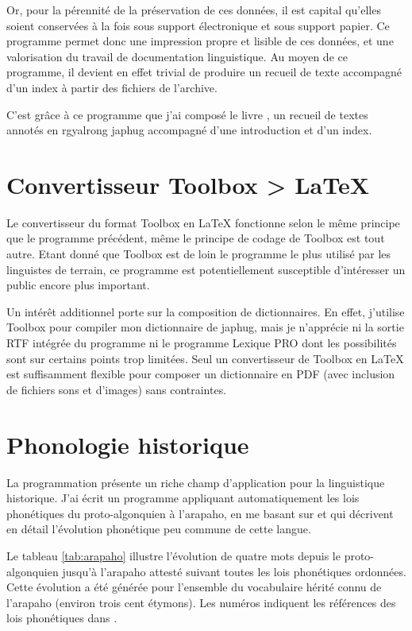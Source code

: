 \documentclass[oldfontcommands,oneside,a4paper,11pt]{memoir}
\begin{document}
 
Or, pour la pérennité de la préservation de ces données, il est capital qu'elles soient conservées à la fois sous support électronique et sous support papier. Ce programme permet donc une impression propre et lisible de ces données, et une valorisation du travail de documentation linguistique. Au moyen de ce programme, il devient en effet trivial de produire un recueil de texte accompagné d'un index à partir des fichiers de l'archive.

C'est grâce à ce programme que j'ai composé le livre \citet{jacques10gesar}, un recueil de textes annotés en rgyalrong japhug accompagné d'une introduction et d'un index.





\section{Convertisseur Toolbox > \LaTeX}
Le convertisseur du format Toolbox en \LaTeX{} fonctionne selon le même principe que le programme précédent, même le principe de codage de Toolbox est tout autre. Etant donné que Toolbox est de loin le programme le plus utilisé par les linguistes de terrain, ce programme est potentiellement susceptible d'intéresser un public encore plus important.

Un intérêt additionnel porte sur la composition de dictionnaires. En effet, j'utilise Toolbox pour compiler mon dictionnaire de japhug, mais je n'apprécie ni la sortie RTF intégrée du programme ni le programme Lexique PRO dont les possibilités sont sur certains points trop limitées. Seul un convertisseur de Toolbox en \LaTeX{} est suffisamment flexible pour composer un dictionnaire en PDF (avec inclusion de fichiers sons et d'images) sans contraintes.

\section{Phonologie historique} \label{sec:comp.ling.hist}
La programmation présente un riche champ d'application pour la linguistique historique. J'ai écrit un programme appliquant automatiquement les lois phonétiques du proto-algonquien à l'arapaho, en me basant   sur \citet{goddard74arapaho} et  \citet{goddard98arapaho}  qui décrivent en détail l'évolution phonétique peu commune de cette langue. 

Le tableau \ref{tab:arapaho} illustre l'évolution de quatre mots depuis le proto-algonquien jusqu'à l'arapaho attesté suivant toutes les lois phonétiques ordonnées. Cette évolution a été générée pour l'ensemble du vocabulaire hérité connu de l'arapaho (environ trois cent étymons). Les numéros indiquent les références des lois phonétiques dans \citet{goddard74arapaho}.
\end{document}
